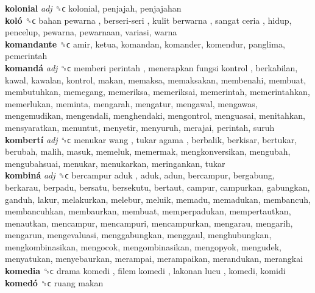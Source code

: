 \textbf{kolonial} \emph{adj}  ␝ϲ  kolonial, penjajah, penjajahan  \\
\textbf{koló} ␝ϲ   bahan pewarna ,  berseri-seri ,  kulit berwarna ,  sangat ceria , hidup, pencelup, pewarna, pewarnaan, variasi, warna  \\
\textbf{komandante} ␝ϲ  amir, ketua, komandan, komander, komendur, panglima, pemerintah  \\
\textbf{komandá} \emph{adj}  ␝ϲ   memberi perintah ,  menerapkan fungsi kontrol , berkabilan, kawal, kawalan, kontrol, makan, memaksa, memaksakan, membenahi, membuat, membutuhkan, memegang, memeriksa, memeriksai, memerintah, memerintahkan, memerlukan, meminta, mengarah, mengatur, mengawal, mengawas, mengemudikan, mengendali, menghendaki, mengontrol, menguasai, menitahkan, mensyaratkan, menuntut, menyetir, menyuruh, merajai, perintah, suruh  \\
\textbf{kombertí} \emph{adj}  ␝ϲ   menukar wang ,  tukar agama , berbalik, berkisar, bertukar, berubah, malih, masuk, memeluk, memermak, mengkonversikan, mengubah, mengubahsuai, menukar, menukarkan, meringankan, tukar  \\
\textbf{kombiná} \emph{adj}  ␝ϲ   bercampur aduk , aduk, adun, bercampur, bergabung, berkarau, berpadu, bersatu, bersekutu, bertaut, campur, campurkan, gabungkan, ganduh, lakur, melakurkan, melebur, meluik, memadu, memadukan, membancuh, membancuhkan, membaurkan, membuat, memperpadukan, mempertautkan, menautkan, mencampur, mencampuri, mencampurkan, mengarau, mengarih, mengarun, mengevaluasi, menggabungkan, menggaul, menghubungkan, mengkombinasikan, mengocok, mengombinasikan, mengopyok, mengudek, menyatukan, menyebaurkan, merampai, merampaikan, merandukan, merangkai  \\
\textbf{komedia} ␝ϲ   drama komedi ,  filem komedi ,  lakonan lucu , komedi, komidi  \\
\textbf{komedó} ␝ϲ   ruang makan   \\
